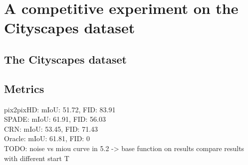 
\section{A competitive experiment on the Cityscapes dataset} \label{sec:5.4}

\subsection{The Cityscapes dataset}
\subsection{Metrics}

pix2pixHD: mIoU: 51.72, FID: 83.91\\
SPADE: mIoU: 61.91, FID: 56.03\\
CRN: mIoU: 53.45, FID: 71.43\\
Oracle: mIoU: 61.81, FID: 0\\

TODO: noise vs miou curve in 5.2 -> base function on results
compare results with different start T


